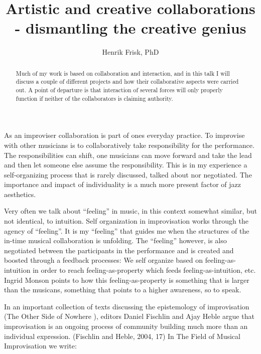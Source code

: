 \documentclass[a4paper,hidelinks]{article}
\title{Artistic and creative collaborations - dismantling the creative genius}
\author{Henrik Frisk, PhD}
\date{}
\begin{document}
\maketitle

\thispagestyle{empty}


\noindent
\begin{abstract}
  Much of my work is based on collaboration and interaction, and in
  this talk I will discuss a couple of different projects and how
  their collaborative aspects were carried out. A point of departure
  is that interaction of several forces will only properly function if
  neither of the collaborators is claiming authority.
\end{abstract}

As an improviser collaboration is part of ones everyday practice. To improvise with other musicians is to collaboratively take responsibility for the performance. The responsibilities can shift, one musicians can move forward and take the lead and then let someone else assume the responsibility. This is in my experience a self-organizing process that is rarely discussed, talked about nor negotiated. The importance and impact of individuality is a much more present factor of jazz aesthetics.

Very often we talk about ``feeling'' in music, in this context somewhat similar, but not identical, to intuition. Self organization in improvisation works through the agency of ``feeling''. It is my ``feeling'' that guides me when the structures of the in-time musical collaboration is unfolding. The ``feeling'' however, is also negotiated between the participants in the performance and is created and boosted through a feedback processes: We self organize based on feeling-as-intuition in order to reach feeling-as-property which feeds feeling-as-intuition, etc. Ingrid Monson points to how this feeling-as-property is something that is larger than the musicans, something that points to a higher awareness, so to speak.

In an important collection of texts discussing the epistemology of improvisation (The Other Side of Nowhere \citet[p. 17]{fischlin2004}), editors Daniel Fischlin and Ajay Heble argue that improvisation is an ongoing process of community building much more than an individual expression. (Fischlin and Heble, 2004, 17) In The Field of Musical Improvisation we write:
\end{document}
